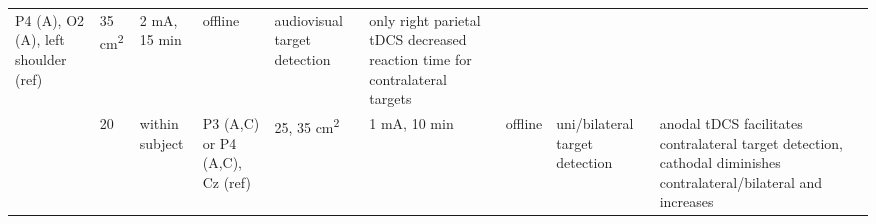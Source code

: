 \documentclass[11pt,]{memoir}
\begin{document}
\begin{longtable}[]{@{}lllllllll@{}}
\begin{minipage}[t]{0.11\columnwidth}
P4 (A), O2 (A), left
shoulder (ref)\strut
\end{minipage} & \begin{minipage}[t]{0.03\columnwidth}\raggedright
35
cm\textsuperscript{2}\strut
\end{minipage} & \begin{minipage}[t]{0.05\columnwidth}\raggedright
2 mA, 15
min\strut
\end{minipage} & \begin{minipage}[t]{0.05\columnwidth}\raggedright
offline\strut
\end{minipage} & \begin{minipage}[t]{0.11\columnwidth}\raggedright
audiovisual target
detection\strut
\end{minipage} & \begin{minipage}[t]{0.24\columnwidth}\raggedright
only right parietal tDCS decreased reaction time for
contralateral targets\strut
\end{minipage}\tabularnewline
\begin{minipage}[t]{0.12\columnwidth}\raggedright
\textcite{Sparing2009}\strut
\end{minipage} & \begin{minipage}[t]{0.02\columnwidth}\raggedright
20\strut
\end{minipage} & \begin{minipage}[t]{0.04\columnwidth}\raggedright
within
subject\strut
\end{minipage} & \begin{minipage}[t]{0.11\columnwidth}\raggedright
P3 (A,C) or P4 (A,C), Cz
(ref)\strut
\end{minipage} & \begin{minipage}[t]{0.03\columnwidth}\raggedright
25,
35
cm\textsuperscript{2}\strut
\end{minipage} & \begin{minipage}[t]{0.05\columnwidth}\raggedright
1 mA, 10
min\strut
\end{minipage} & \begin{minipage}[t]{0.05\columnwidth}\raggedright
offline\strut
\end{minipage} & \begin{minipage}[t]{0.11\columnwidth}\raggedright
uni/bilateral target
detection\strut
\end{minipage} & \begin{minipage}[t]{0.24\columnwidth}\raggedright
anodal tDCS facilitates contralateral target detection,
cathodal diminishes contralateral/bilateral and increases

\end{minipage}
\end{longtable}
\end{document}
